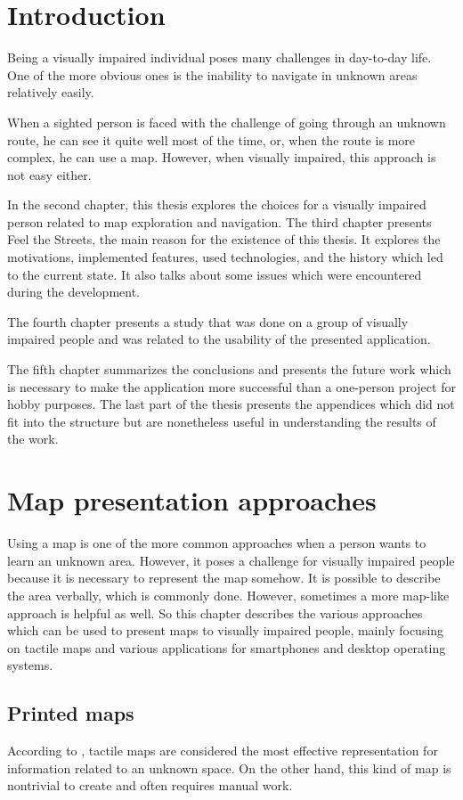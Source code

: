 \documentclass[nolof,digital]{fithesis3}
\begin{document}
\chapter{Introduction}
Being a visually impaired individual poses many challenges in day-to-day life. One of the more obvious ones is the inability to navigate in unknown areas relatively easily.

When a sighted person is faced with the challenge of going through an unknown route, he can see it quite well most of the time, or, when the route is more complex, he can use a map. However, when visually impaired, this approach is not easy either.

In the second chapter, this thesis explores the choices for a visually impaired person related to map exploration and navigation.
The third chapter presents Feel the Streets, the main reason for the existence of this thesis. It explores the motivations, implemented features, used technologies, and the history which led to the current state. It also talks about some issues which were encountered during the development.

The fourth chapter presents a study that was done on a group of visually impaired people and was related to the usability of the presented application.

The fifth chapter summarizes the conclusions and presents the future work which is necessary to make the application more successful than a one-person project for hobby purposes. The last part of the thesis presents the appendices which did not fit into the structure but are nonetheless useful in understanding the results of the work.
\chapter{Map presentation approaches}
Using a map is one of the more common approaches when a person wants to learn an unknown area. However, it poses a challenge for visually impaired people because it is necessary to represent the map somehow. It is possible to describe the area verbally, which is commonly done. However, sometimes a more map-like approach is helpful as well. So this chapter describes the various approaches which can be used to present maps to visually impaired people, mainly focusing on tactile maps and various applications for smartphones and desktop operating systems.
\section{Printed maps}
According to \parencite{orientation_aids_from_foundations}, tactile maps are considered the most effective representation for information related to an unknown space. On the other hand, this kind of map is nontrivial to create and often requires manual work.
\end{document}
